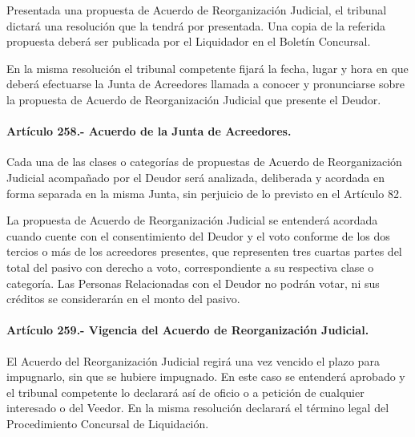\documentclass[
]{book}
\begin{document}
Presentada una propuesta de Acuerdo de Reorganización Judicial, el tribunal dictará una resolución que la tendrá por presentada. Una copia de la referida propuesta deberá ser publicada por el Liquidador en el Boletín Concursal.

En la misma resolución el tribunal competente fijará la fecha, lugar y hora en que deberá efectuarse la Junta de Acreedores llamada a conocer y pronunciarse sobre la propuesta de Acuerdo de Reorganización Judicial que presente el Deudor.

\hypertarget{artuxedculo-258.--acuerdo-de-la-junta-de-acreedores.}{%
\paragraph*{Artículo 258.- Acuerdo de la Junta de Acreedores.}\label{artuxedculo-258.--acuerdo-de-la-junta-de-acreedores.}}

Cada una de las clases o categorías de propuestas de Acuerdo de Reorganización Judicial acompañado por el Deudor será analizada, deliberada y acordada en forma separada en la misma Junta, sin perjuicio de lo previsto en el Artículo 82.

La propuesta de Acuerdo de Reorganización Judicial se entenderá acordada cuando cuente con el consentimiento del Deudor y el voto conforme de los dos tercios o más de los acreedores presentes, que representen tres cuartas partes del total del pasivo con derecho a voto, correspondiente a su respectiva clase o categoría. Las Personas Relacionadas con el Deudor no podrán votar, ni sus créditos se considerarán en el monto del pasivo.

\hypertarget{artuxedculo-259.--vigencia-del-acuerdo-de-reorganizaciuxf3n-judicial.}{%
\paragraph*{Artículo 259.- Vigencia del Acuerdo de Reorganización Judicial.}\label{artuxedculo-259.--vigencia-del-acuerdo-de-reorganizaciuxf3n-judicial.}}

El Acuerdo del Reorganización Judicial regirá una vez vencido el plazo para impugnarlo, sin que se hubiere impugnado. En este caso se entenderá aprobado y el tribunal competente lo declarará así de oficio o a petición de cualquier interesado o del Veedor. En la misma resolución declarará el término legal del Procedimiento Concursal de Liquidación.
\end{document}
